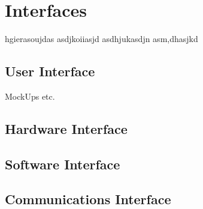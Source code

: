 \section{Interfaces}
hgierasoujdas asdjkoiiasjd asdhjukasdjn asm,dhasjkd

	\subsection{User Interface}
		MockUps etc.
		
	\subsection{Hardware Interface}
	
	\subsection{Software Interface}
	
	\subsection{Communications Interface}
	
	
	